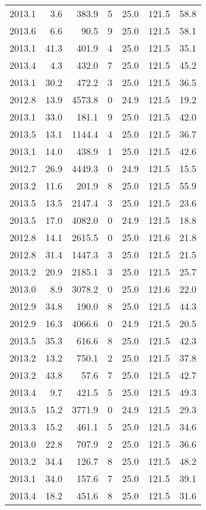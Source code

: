 \begin{tabular}{rrrrrrr}
2013.1 & 3.6 & 383.9 & 5 & 25.0 & 121.5 & 58.8 \\
2013.6 & 6.6 & 90.5 & 9 & 25.0 & 121.5 & 58.1 \\
2013.1 & 41.3 & 401.9 & 4 & 25.0 & 121.5 & 35.1 \\
2013.4 & 4.3 & 432.0 & 7 & 25.0 & 121.5 & 45.2 \\
2013.1 & 30.2 & 472.2 & 3 & 25.0 & 121.5 & 36.5 \\
2012.8 & 13.9 & 4573.8 & 0 & 24.9 & 121.5 & 19.2 \\
2013.1 & 33.0 & 181.1 & 9 & 25.0 & 121.5 & 42.0 \\
2013.5 & 13.1 & 1144.4 & 4 & 25.0 & 121.5 & 36.7 \\
2013.1 & 14.0 & 438.9 & 1 & 25.0 & 121.5 & 42.6 \\
2012.7 & 26.9 & 4449.3 & 0 & 24.9 & 121.5 & 15.5 \\
2013.2 & 11.6 & 201.9 & 8 & 25.0 & 121.5 & 55.9 \\
2013.5 & 13.5 & 2147.4 & 3 & 25.0 & 121.5 & 23.6 \\
2013.5 & 17.0 & 4082.0 & 0 & 24.9 & 121.5 & 18.8 \\
2012.8 & 14.1 & 2615.5 & 0 & 25.0 & 121.6 & 21.8 \\
2012.8 & 31.4 & 1447.3 & 3 & 25.0 & 121.5 & 21.5 \\
2013.2 & 20.9 & 2185.1 & 3 & 25.0 & 121.5 & 25.7 \\
2013.0 & 8.9 & 3078.2 & 0 & 25.0 & 121.6 & 22.0 \\
2012.9 & 34.8 & 190.0 & 8 & 25.0 & 121.5 & 44.3 \\
2012.9 & 16.3 & 4066.6 & 0 & 24.9 & 121.5 & 20.5 \\
2013.5 & 35.3 & 616.6 & 8 & 25.0 & 121.5 & 42.3 \\
2013.2 & 13.2 & 750.1 & 2 & 25.0 & 121.5 & 37.8 \\
2013.2 & 43.8 & 57.6 & 7 & 25.0 & 121.5 & 42.7 \\
2013.4 & 9.7 & 421.5 & 5 & 25.0 & 121.5 & 49.3 \\
2013.5 & 15.2 & 3771.9 & 0 & 24.9 & 121.5 & 29.3 \\
2013.3 & 15.2 & 461.1 & 5 & 25.0 & 121.5 & 34.6 \\
2013.0 & 22.8 & 707.9 & 2 & 25.0 & 121.5 & 36.6 \\
2013.2 & 34.4 & 126.7 & 8 & 25.0 & 121.5 & 48.2 \\
2013.1 & 34.0 & 157.6 & 7 & 25.0 & 121.5 & 39.1 \\
2013.4 & 18.2 & 451.6 & 8 & 25.0 & 121.5 & 31.6 \\

\end{tabular}
